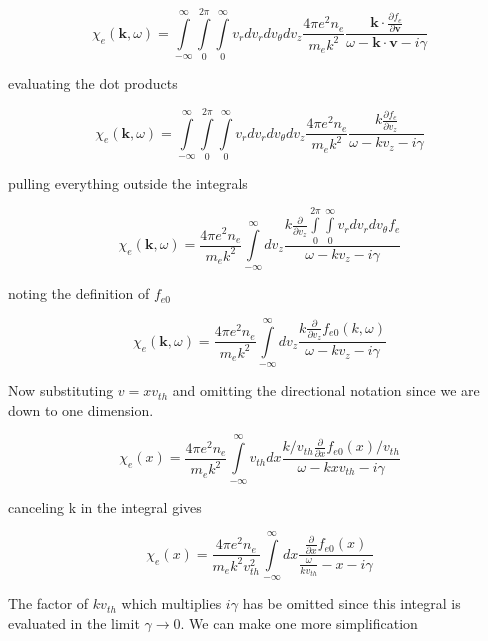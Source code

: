 \documentclass[11pt]{article}
\begin{document}
\begin{equation}
    \chi_e(\textbf{k},\omega)=\int\limits_{-\infty}^{\infty}\int\limits_{0}^{2 \pi}\int\limits_{0}^{\infty} v_rdv_r dv_\theta dv_z \frac{4\pi e^2 n_e}{m_e k^2} \frac{\textbf{k} \cdot \frac{\partial f_e}{\partial\textbf{v}}}{\omega-\textbf{k}\cdot\textbf{v}-i\gamma}
\end{equation}{}

evaluating the dot products

\begin{equation}
    \chi_e(\textbf{k},\omega)=\int\limits_{-\infty}^{\infty}\int\limits_{0}^{2 \pi}\int\limits_{0}^{\infty} v_rdv_r dv_\theta dv_z \frac{4\pi e^2 n_e}{m_e k^2} \frac{k \frac{\partial f_e}{\partial v_z}}{\omega-kv_z-i\gamma}
\end{equation}{}

pulling everything outside the integrals

\begin{equation}
    \chi_e(\textbf{k},\omega)=\frac{4\pi e^2 n_e}{m_e k^2} \int\limits_{-\infty}^{\infty} dv_z \frac{k \frac{\partial}{\partial v_z}\int\limits_{0}^{2 \pi}\int\limits_{0}^{\infty} v_rdv_r dv_\theta f_e}{\omega-kv_z-i\gamma}
\end{equation}{}

noting the definition of $f_{e0}$

\begin{equation}
    \chi_e(\textbf{k},\omega)=\frac{4\pi e^2 n_e}{m_e k^2} \int\limits_{-\infty}^{\infty} dv_z \frac{k \frac{\partial}{\partial v_z} f_{e0}(k,\omega)}{\omega-kv_z-i\gamma}
\end{equation}{}

Now substituting $v=xv_{th}$ and omitting the directional notation since we are down to one dimension.

\begin{equation}
    \chi_e(x)=\frac{4\pi e^2 n_e}{m_e k^2} \int\limits_{-\infty}^{\infty} v_{th}dx \frac{k/v_{th} \frac{\partial}{\partial x} f_{e0}(x)/v_{th}}{\omega-kxv_{th}-i\gamma}
\end{equation}{}

canceling k in the integral gives

\begin{equation}
    \chi_e(x)=\frac{4\pi e^2 n_e}{m_e k^2 v_{th}^2} \int\limits_{-\infty}^{\infty} dx \frac{\frac{\partial}{\partial x} f_{e0}(x)}{\frac{\omega}{kv_{th}}-x-i\gamma}
\end{equation}{}

The factor of $kv_{th}$ which multiplies $i\gamma$ has be omitted since this integral is evaluated in the limit $\gamma \rightarrow 0$. We can make one more simplification
\end{document}
